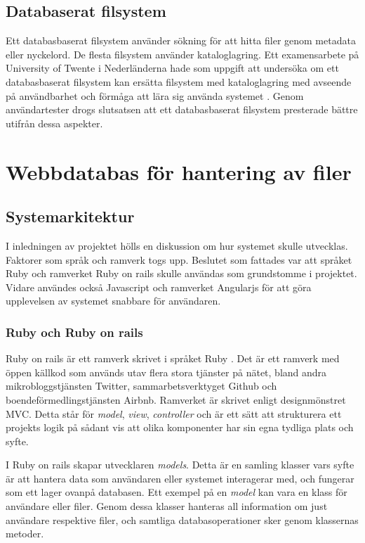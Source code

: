 \documentclass[a4paper,12pt,oneside,final]{extbook}
\begin{document}
\section{Databaserat filsystem}
Ett databasbaserat filsystem använder sökning för att hitta filer genom metadata eller nyckelord. De flesta filsystem använder kataloglagring. Ett examensarbete på University of Twente i Nederländerna hade som uppgift att undersöka om ett databasbaserat filsystem kan ersätta filsystem med kataloglagring med avseende på användbarhet och förmåga att lära sig använda systemet \cite{twente}. Genom användartester drogs slutsatsen att ett databasbaserat filsystem presterade bättre utifrån dessa aspekter.

\chapter{Webbdatabas för hantering av filer}

\section{Systemarkitektur}
I inledningen av projektet hölls en diskussion om hur systemet skulle utvecklas. Faktorer som språk och ramverk togs upp. Beslutet som fattades var att språket Ruby och ramverket Ruby on rails skulle användas som grundstomme i projektet. Vidare användes också Javascript och ramverket Angularjs för att göra upplevelsen av systemet snabbare för användaren.

\subsection{Ruby och Ruby on rails}
Ruby on rails är ett ramverk skrivet i språket Ruby \cite{rubylang}. Det är ett ramverk med öppen källkod som används utav flera stora tjänster på nätet, bland andra mikrobloggstjänsten Twitter, sammarbetsverktyget Github och boendeförmedlingstjänsten Airbnb. Ramverket är skrivet enligt designmönstret MVC. Detta står för \textit{model}, \textit{view}, \textit{controller} och är ett sätt att strukturera ett projekts logik på sådant vis att olika komponenter har sin egna tydliga plats och syfte.

I Ruby on rails skapar utvecklaren \textit{models}. Detta är en samling klasser vars syfte är att hantera data som användaren eller systemet interagerar med, och fungerar som ett lager ovanpå databasen. Ett exempel på en \textit{model} kan vara en klass för användare eller filer. Genom dessa klasser hanteras all information om just användare respektive filer, och samtliga databasoperationer sker genom klassernas metoder.
\end{document}
